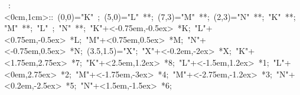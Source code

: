 

\hbox{
\xy    <1cm,0cm>:<0cm,1cm>::
       (0,0)="K" ; (5,0)="L" **\dir{-}; 
       (7,3)="M" **\dir{-}; (2,3)="N" **\dir{-}; "K" **\dir{-};
       "M" **\dir{-}; "L" ; "N" **\dir{-};
       "K"+<-0.75em,-0.5ex> *{K};
       "L"+<0.75em,-0.5ex> *{L};
       "M"+<0.75em,0.5ex> *{M};
       "N"+<-0.75em,0.5ex> *{N};  (3.5,1.5)="X"; "X"+<-0.2em,-2ex> *{X};
       "K"+<1.75em,2.75ex> *{7};  "K"+<2.5em,1.2ex> *{8};  
       "L"+<-1.5em,1.2ex> *{1};   "L"+<0em,2.75ex> *{2};
       "M"+<-1.75em,-3ex> *{4};   "M"+<-2.75em,-1.2ex> *{3};
       "N"+<0.2em,-2.5ex> *{5};  "N"+<1.5em,-1.5ex> *{6};
       \endxy}
	   
